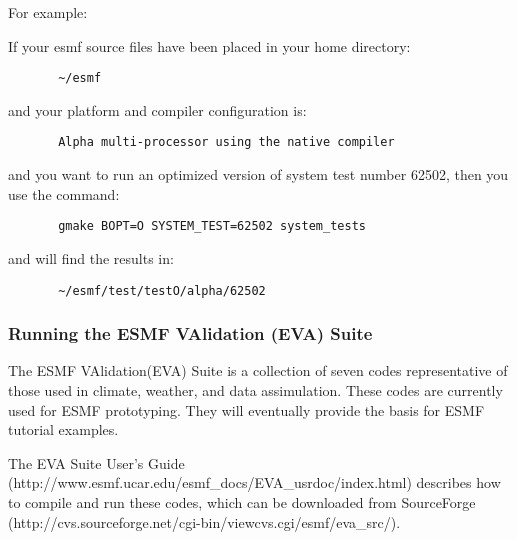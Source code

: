 For example: 

If your esmf source files have been placed in your home directory:
\begin{verbatim}
       ~/esmf
\end{verbatim}

and your platform and compiler configuration is:
\begin{verbatim}
       Alpha multi-processor using the native compiler
\end{verbatim}

and you want to run an optimized version of system test number 62502,
then you use the command:
\begin{verbatim}
       gmake BOPT=O SYSTEM_TEST=62502 system_tests
\end{verbatim}

and will find the results in:
\begin{verbatim}
       ~/esmf/test/testO/alpha/62502 
\end{verbatim}

\subsubsection{Running the ESMF VAlidation (EVA) Suite}
\label{EVATestDescription}

The ESMF VAlidation(EVA) Suite is a collection of seven codes representative of those used in climate, 
weather, and data assimulation. These codes are currently used for ESMF prototyping. They will eventually 
provide the basis for ESMF tutorial examples.

The EVA Suite User's Guide (http://www.esmf.ucar.edu/esmf\_docs/EVA\_usrdoc/index.html) describes how to 
compile and run these codes, which can be downloaded from 
SourceForge (http://cvs.sourceforge.net/cgi-bin/viewcvs.cgi/esmf/eva\_src/). 




























